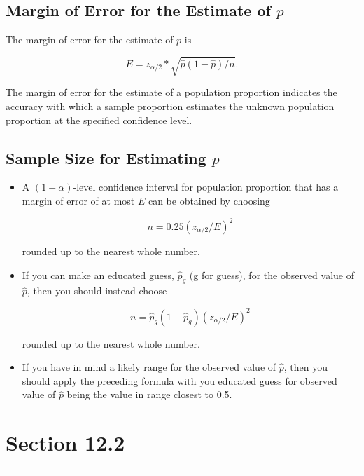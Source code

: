 \documentclass[12pt]{article}
\begin{document}
        \subsection*{Margin of Error for the Estimate of $p$}
            The margin of error for the estimate of $p$ is
            \begin{center}
                \[
                    E = z_{\alpha/2}*\sqrt{\hat{p}(1-\hat{p})/n}.
                \]
            \end{center}
            The margin of error for the estimate of a population proportion indicates the
            accuracy with which a sample proportion estimates the unknown population
            proportion at the specified confidence level.
        \subsection*{Sample Size for Estimating $p$}
            \begin{itemize}
                \item A $(1-\alpha)$-level confidence interval for population proportion
                that has a margin of error of at most $E$ can be obtained by choosing
                \begin{center}
                    \[
                        n = 0.25(z_{\alpha/2}/E)^2    
                    \]
                \end{center}
                rounded up to the nearest whole number.
                \item If you can make an educated guess, $\hat{p}_g$ (g for guess), for
                the observed value of $\hat{p}$, then you should instead choose
                \begin{center}
                    \[
                        n = \hat{p}_g(1-\hat{p}_g)(z_{\alpha/2}/E)^2
                    \]
                \end{center}
                rounded up to the nearest whole number. 
                \item If you have in mind a likely range for the observed value of 
                $\hat{p}$, then you should apply the preceding formula with you educated
                guess for observed value of $\hat{p}$ being the value in range closest to
                0.5.
            \end{itemize}

    \section*{Section 12.2}
    \noindent\rule{\textwidth}{0.4pt}
\end{document}
